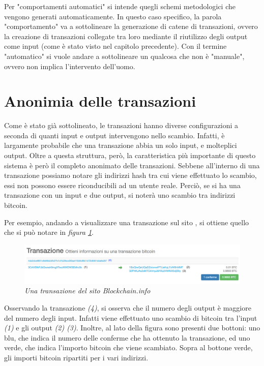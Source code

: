 Per "comportamenti automatici" si intende quegli schemi metodologici che vengono generati automaticamente. In questo caso specifico, la parola "comportamento" va a sottolineare la generazione di catene di transazioni, ovvero la creazione di transazioni collegate tra loro mediante il riutilizzo degli output come input (come è stato visto nel capitolo precedente). Con il termine "automatico" si vuole andare a sottolineare un qualcosa che non è "manuale", ovvero non implica l'intervento dell'uomo.

\section{Anonimia delle transazioni}

Come è stato già sottolineato, le transazioni hanno diverse configurazioni a seconda di quanti input e output intervengono nello scambio. Infatti, è largamente probabile che una transazione abbia un solo input, e molteplici output. Oltre a questa struttura, però, la caratteristica più importante di questo sistema è però il completo anonimato delle transazioni. Sebbene all'interno di una transazione possiamo notare gli indirizzi hash tra cui viene effettuato lo scambio, essi non possono essere riconducibili ad un utente reale. Perciò, se si ha una transazione con un input e due output, si noterà uno scambio tra indirizzi bitcoin. 

Per esempio, andando a visualizzare una transazione sul sito \cite{blockchainInfo}, si ottiene quello che si può notare in \textit{figura \ref{fig:realtx}}.
\begin{figure}[htbp]
	\centering
	\includegraphics[width = \linewidth]{figure/realtx}
	\caption{\textit{Una transazione del sito Blockchain.info \cite{blockchaininfo} \label{fig:realtx}}}
\end{figure}
Osservando la transazione \textit{(4)}, si osserva che il numero degli output è maggiore del numero degli input. Infatti viene effettuato uno scambio di bitcoin tra l'input \textit{(1)} e gli output \textit{(2) (3)}. Inoltre, al lato della figura sono presenti due bottoni: uno blu, che indica il numero delle conferme che ha ottenuto la transazione, ed uno verde, che indica l'importo bitcoin che viene scambiato. Sopra al bottone verde, gli importi bitcoin ripartiti per i vari indirizzi.

